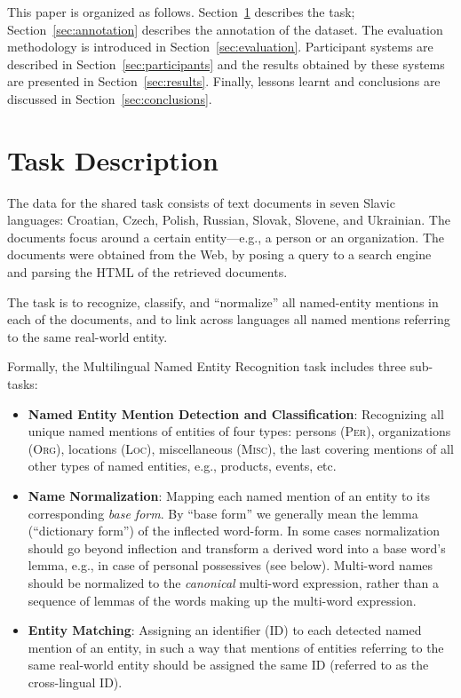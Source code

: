 \documentclass[11pt]{article}
\begin{document}
This paper is organized as follows.  Section~\ref{sec:task} describes the task;
Section~\ref{sec:annotation} describes the annotation of the dataset.  The evaluation
methodology is introduced in Section~\ref{sec:evaluation}.  Participant systems are described
in Section~\ref{sec:participants} and the results obtained by these systems are presented in
Section~\ref{sec:results}.  Finally, lessons learnt and conclusions are discussed in
Section~\ref{sec:conclusions}.

\section{Task Description}
\label{sec:task}


The data for the shared task consists of text documents {in seven Slavic languages: Croatian,
  Czech, Polish, Russian, Slovak, Slovene, and Ukrainian. The documents focus around a certain
  entity---e.g., a person or an organization. The documents were obtained from the Web, by
  posing a query to a search engine and parsing the HTML of the retrieved documents.}

The task {is} to recognize, classify, and ``normalize'' all named-entity mentions in each of
the documents, and to link across languages all named mentions referring to the same
real-world entity.

Formally, the Multilingual Named Entity Recognition task includes three
sub-tasks:

\begin{itemize}

\item \textbf{Named Entity Mention Detection and Classification}:
  Recognizing all unique named mentions of entities of four types:
  persons (\textsc{Per}), organizations (\textsc{Org}), locations (\textsc{Loc}), miscellaneous
  (\textsc{Misc}), the last covering mentions of all other types of named
  entities, e.g., products, events, etc.

\item \textbf{Name Normalization}: {Mapping each named mention of an entity to its
    corresponding {\em base form}.  By ``base form'' we generally mean the lemma (``dictionary
    form'') of the inflected word-form.  In some cases normalization should go beyond
    inflection and transform a derived word into a base word's lemma, e.g., in case of
    personal possessives (see below).  Multi-word names should be normalized to the {\em
      canonical} multi-word expression, rather than a sequence of lemmas of the words making
    up the multi-word expression.}

\item \textbf{Entity Matching}: Assigning an identifier (ID) to each detected named mention of
  an entity, in such a way that mentions of entities referring to the same real-world entity
  should be assigned the same ID (referred to as the cross-lingual ID).

\end{itemize}
\end{document}
